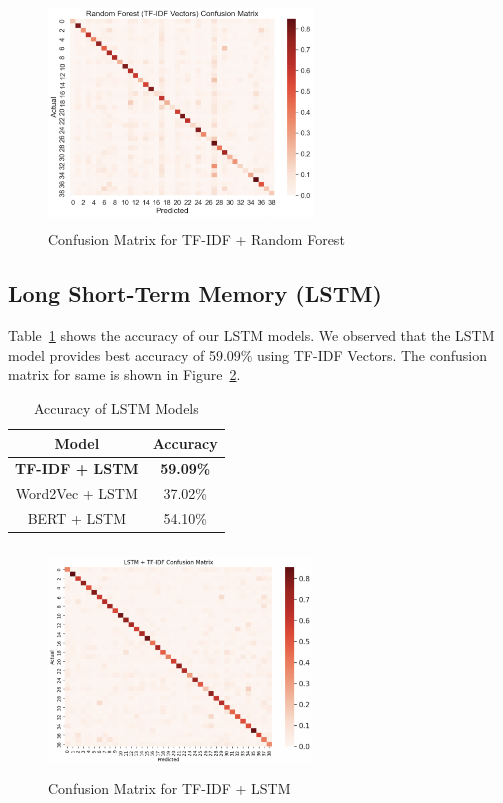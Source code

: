 \documentclass[conference]{IEEEtran}
\begin{document}
\begin{figure}[!htb]
\centering
\includegraphics[width=70mm, height = 60mm]{Images/Random Forest.png}
\caption{Confusion Matrix for TF-IDF + Random Forest}\label{fig:rf}
\end{figure}

\subsection{Long Short-Term Memory (LSTM)}

Table~\ref{tab: lstm_models} shows the accuracy of our LSTM models. We observed that the LSTM model provides best accuracy of 59.09\% using TF-IDF Vectors. The confusion matrix for same is shown in Figure~\ref{fig:lstm}.

\begin{table}[!htb]
\centering
\caption{Accuracy of LSTM Models}
\label{tab: lstm_models}
\begin{tabular}{c|c}\midrule\midrule
Model & Accuracy\\ \midrule
\textbf{TF-IDF + LSTM} & \textbf{59.09\%} \\
Word2Vec + LSTM & 37.02\% \\
BERT + LSTM & 54.10\% \\ \midrule\midrule
\end{tabular}
\end{table}

\begin{figure}[!htb]
\centering
\includegraphics[width=70mm, height = 60mm]{Images/LSTM.png}
\caption{Confusion Matrix for TF-IDF + LSTM}\label{fig:lstm}
\end{figure}
\end{document}
